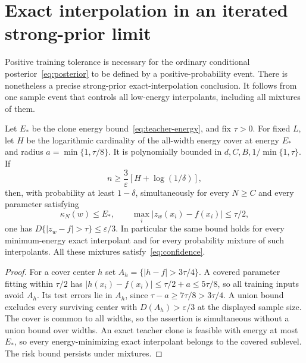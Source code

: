 \documentclass[11pt]{article}
\theoremstyle{remark}\newtheorem{remark}[theorem]{Remark}
\begin{document}


\section{Exact interpolation in an iterated strong-prior limit}
\label{sec:exact}
Positive training tolerance is necessary for the ordinary conditional
posterior~\eqref{eq:posterior} to be defined by a positive-probability
event. There is nonetheless a precise strong-prior exact-interpolation
conclusion. It follows from one sample event that controls all low-energy
interpolants, including all mixtures of them.

\begin{proposition}
\label{prop:exact}
Let $E_*$ be the clone energy bound~\eqref{eq:teacher-energy}, and fix
$\tau>0$. For fixed $L$, let $H$ be the logarithmic cardinality of the
all-width energy cover at energy $E_*$ and radius
$a=\min\{1,\tau/8\}$. It is polynomially bounded in
$d,C,B,1/\min\{1,\tau\}$. If
\[
 n\geq\frac3\varepsilon[H+\log(1/\delta)],
\]
then, with probability at least $1-\delta$, simultaneously for every
$N\geq C$ and every parameter satisfying
\[
 \kappa_N(w)\leq E_*,\qquad
 \max_i|z_w(x_i)-f(x_i)|\leq\tau/2,
\]
one has $D\{|z_w-f|>\tau\}\leq\varepsilon/3$.
In particular the same bound holds for every minimum-energy exact
interpolant and for every probability mixture of such interpolants.
All these mixtures satisfy~\eqref{eq:confidence}.
\end{proposition}
\begin{proof}
For a cover center $h$ set $A_h=\{|h-f|>3\tau/4\}$.
A covered parameter fitting within $\tau/2$ has
$|h(x_i)-f(x_i)|\leq\tau/2+a\leq5\tau/8$, so all training inputs
avoid $A_h$. Its test errors lie in $A_h$, since
$\tau-a\geq7\tau/8>3\tau/4$. A union bound excludes every surviving
center with $D(A_h)>\varepsilon/3$ at the displayed sample size.
The cover is common to all widths, so the assertion is simultaneous
without a union bound over widths. An exact teacher clone is feasible
with energy at most $E_*$, so every energy-minimizing exact interpolant
belongs to the covered sublevel. The risk bound persists under mixtures.
\end{proof}
\end{document}
